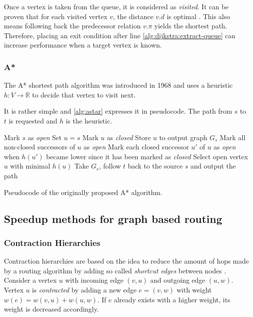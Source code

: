 			Once a vertex is taken from the queue, it is considered as \emph{visited}.
			It can be proven that for each visited vertex $v$, the distance $v.d$ is optimal \cite[659-661]{cormen-introduction-to-alg}.
			This also means following back the predecessor relation $v.\pi$ yields the shortest path.
			Therefore, placing an exit condition after line \ref{alg:dijkstra:extract-queue} can increase performance when a target vertex is known.
		
		\subsubsection{A*}
		\label{subsubsec:astar}
		
			The A* shortest path algorithm was introduced in 1968 and uses a heuristic $h : V \rightarrow \mathbb{R}$ to decide that vertex to visit next.
			
			It is rather simple and \cref{alg:astar} expresses it in pseudocode.
			The path from $s$ to $t$ is requested and $h$ is the heuristic.
			
			\begin{algorithm}[h]
				\begin{algorithmic}[1]
					\State Mark $s$ as \emph{open}
					\State Set $u = s$
						\State Mark $u$ as \emph{closed}
						\State Store $u$ to output graph $G_s$
						\State Mark all non-closed successors of $u$ as \emph{open}
						\State Mark each closed successor $u'$ of $u$ as \emph{open} when $h(u')$ became lower since it has been marked as \emph{closed}
						\State Select open vertex $u$ with minimal $h(u)$
					\EndWhile
					\State Take $G_s$, follow $t$ back to the source $s$ and output the path
				\end{algorithmic}
				\caption{Pseudocode of the originally proposed A* algorithm.}
				\label{alg:astar}
			\end{algorithm}
		
	\subsection{Speedup methods for graph based routing}
	\label{subsec:speedup-methods}
		
		\subsubsection{Contraction Hierarchies}
		\label{subsubsec:ch}
		
			Contraction hierarchies are based on the idea to reduce the amount of hops made by a routing algorithm by adding so called \emph{shortcut edges} between nodes \cite{geisberger-contraction-hierarchies}.
			Consider a vertex $u$ with incoming edge $(v, u)$ and outgoing edge $(u, w)$.
			Vertex $u$ is \emph{contracted} by adding a new edge $e = (v, w)$ with weight $w(e) = w(v, u) + w(u, w)$.
			If $e$ already exists with a higher weight, its weight is decreased accordingly.
			
